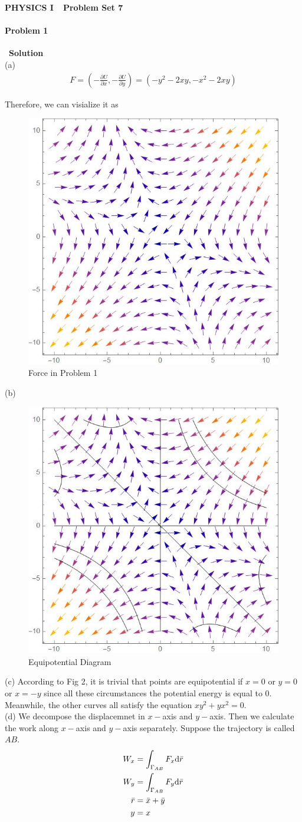 \documentclass[12pt,a4paper]{article}
\begin{document}
\centerline{\Huge{{\textbf{PHYSICS I\ \ Problem Set 7}}}}
\vspace{0.5cm}
\paragraph{\large \textbf{Problem 1}}~{\textbf{Solution}}
\vspace{2mm}\\
\noindent (a) 
\begin{align}
    F = \left( -\frac{\partial U}{\partial x}, -\frac{\partial U}{\partial y} \right) = (-y^2-2xy, -x^2-2xy)
\end{align}
\par Therefore, we can visialize it as
\begin{figure}[H]
    \centering
    \includegraphics[width=0.3\linewidth]{1.jpg}
    \caption{Force in Problem 1}
    \label{fig-1}
\end{figure}
\noindent (b) 
\begin{figure}[H]
    \centering
    \includegraphics[width=0.3\linewidth]{2.jpg}
    \caption{Equipotential Diagram}
    \label{fig-2}
\end{figure}
\noindent (c) According to Fig 2, it is trivial that points are equipotential if $x=0$ or $y=0$ 
or $x=-y$ since all these circumstances the potential energy is equal to 0. Meanwhile, the other
curves all satisfy the equation $xy^2 + yx^2 = 0$.\\
\noindent (d) We decompose the displacemnet in $x-$axis and $y-$axis. Then we calculate the work 
along $x-$axis and $y-$axis separately. Suppose the trajectory is called $AB$.
\begin{align}
    W_x &= \int_{\Gamma_{AB}} F_x {\rm d} \bar{r}\\
    W_y &= \int_{\Gamma_{AB}} F_y {\rm d} \bar{r}\\
    \bar{r} &= \bar{x} + \bar{y}\\
    y &= x
\end{align}
\end{document}
